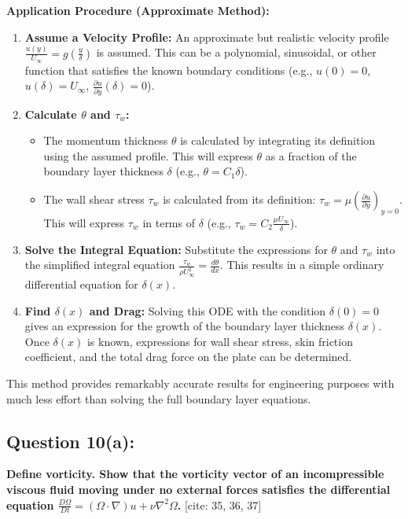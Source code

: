 \documentclass{article}
\begin{document}
\textbf{Application Procedure (Approximate Method):}
\begin{enumerate}
    \item \textbf{Assume a Velocity Profile:} An approximate but realistic velocity profile $\frac{u(y)}{U_\infty} = g(\frac{y}{\delta})$ is assumed. This can be a polynomial, sinusoidal, or other function that satisfies the known boundary conditions (e.g., $u(0)=0$, $u(\delta)=U_\infty$, $\frac{\partial u}{\partial y}(\delta)=0$).
    \item \textbf{Calculate $\theta$ and $\tau_w$:}
        \begin{itemize}
            \item The momentum thickness $\theta$ is calculated by integrating its definition using the assumed profile. This will express $\theta$ as a fraction of the boundary layer thickness $\delta$ (e.g., $\theta = C_1 \delta$).
            \item The wall shear stress $\tau_w$ is calculated from its definition: $\tau_w = \mu (\frac{\partial u}{\partial y})_{y=0}$. This will express $\tau_w$ in terms of $\delta$ (e.g., $\tau_w = C_2 \frac{\mu U_\infty}{\delta}$).
        \end{itemize}
    \item \textbf{Solve the Integral Equation:} Substitute the expressions for $\theta$ and $\tau_w$ into the simplified integral equation $\frac{\tau_w}{\rho U_\infty^2} = \frac{d\theta}{dx}$. This results in a simple ordinary differential equation for $\delta(x)$.
    \item \textbf{Find $\delta(x)$ and Drag:} Solving this ODE with the condition $\delta(0)=0$ gives an expression for the growth of the boundary layer thickness $\delta(x)$. Once $\delta(x)$ is known, expressions for wall shear stress, skin friction coefficient, and the total drag force on the plate can be determined.
\end{enumerate}
This method provides remarkably accurate results for engineering purposes with much less effort than solving the full boundary layer equations.
\hrulefill

\subsection*{\textbf{Question 10(a):}}
\textbf{Define vorticity. Show that the vorticity vector of an incompressible viscous fluid moving under no external forces satisfies the differential equation $\frac{D\Omega}{Dt}=(\Omega\cdot\nabla)u+\nu\nabla^{2}\Omega$.} [cite: 35, 36, 37]
\end{document}
